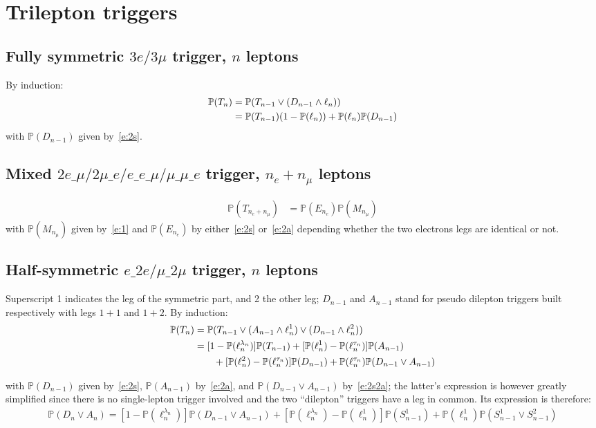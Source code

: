 \documentclass{article}
\newcommand{\pro}{\ensuremath{\mathbb{P}}}
\begin{document}
\section{Trilepton triggers}

\subsection{Fully symmetric $3e/3\mu$ trigger, $n$ leptons}
By induction:
\begin{align}
\pro(T_n) &= \pro(T_{n-1} \vee (D_{n-1}\wedge \ell_n))\notag\\
&= \pro(T_{n-1})(1-\pro(\ell_n)) + \pro(\ell_n)\pro(D_{n-1})
\end{align}
with $\pro(D_{n-1})$ given by~\ref{e:2s}. 

\subsection{Mixed $2e\_\mu/2\mu\_e/e\_e\_\mu/\mu\_\mu\_e$ trigger, $n_e+n_\mu$ leptons}


\begin{align}
\pro(T_{n_e+n_\mu}) &= \pro(E_{n_e})\pro(M_{n_\mu})
\end{align}
with $\pro(M_{n_\mu})$ given by~\ref{e:1} and $\pro(E_{n_e})$ by either~\ref{e:2s} or~\ref{e:2a} 
depending whether the two electrons legs are identical or not. 




\subsection{Half-symmetric $e\_2e/\mu\_2\mu$ trigger, $n$ leptons}
Superscript 1 indicates the leg of the symmetric part, and 2 the other leg; $D_{n-1}$ 
and $A_{n-1}$ stand for pseudo dilepton triggers built respectively with legs $1+1$ and $1+2$. 
By induction: 
\begin{align}
\pro(T_n) &= \pro(T_{n-1} \vee (A_{n-1}\wedge \ell_n^1) \vee (D_{n-1}\wedge \ell_n^2))\notag\\
&= [1-\pro(\ell_n^{\lambda_n})]\pro(T_{n-1}) +  [\pro(\ell_n^1) - \pro(\ell_n^{\tau_n})]\pro(A_{n-1})\notag\\
&\qquad+ [\pro(\ell_n^2) - \pro(\ell_n^{\tau_n})]\pro(D_{n-1})
+ \pro(\ell_n^{\tau_n})\pro(D_{n-1}\vee A_{n-1})
\end{align}

with $\pro(D_{n-1})$ given by~\ref{e:2s}, $\pro(A_{n-1})$ by~\ref{e:2a}, 
 and $\pro(D_{n-1}\vee A_{n-1})$ by~\ref{e:2s2a}; 
the latter's expression is however greatly simplified since there is no single-lepton trigger involved 
and the two ``dilepton'' triggers have a leg in common. 
Its expression is therefore: 
\begin{align}
\pro(D_{n}\vee A_{n}) = [1-\pro(\ell_n^{\lambda_n})]\pro(D_{n-1}\vee A_{n-1}) + [\pro(\ell_n^{\lambda_n})-\pro(\ell_n^1)]\pro(S_{n-1}^1)
+\pro(\ell_n^1)\pro(S_{n-1}^1\vee S_{n-1}^2) 
\end{align}
\end{document}
